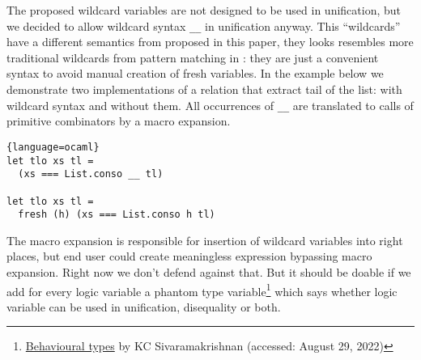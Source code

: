 The proposed wildcard variables are not designed to be used in unification, but we decided to allow wildcard syntax \lstinline|__| in unification anyway.
This ``wildcards'' have a different semantics from proposed in this paper, they looks resembles more traditional wildcards from pattern matching in \OCaml{}: they are just a convenient syntax to avoid manual creation of fresh variables. In the example below we demonstrate two implementations of a relation that extract tail of the list: with wildcard syntax and without them. All occurrences of \lstinline|__| are translated to calls of primitive combinators by a macro expansion.

\begin{minipage}{\linewidth}
\begin{lstlisting}{language=ocaml}
let tlo xs tl =
  (xs === List.conso __ tl)

let tlo xs tl =
  fresh (h) (xs === List.conso h tl)
\end{lstlisting}
\end{minipage}

\noindent The macro expansion is responsible for insertion of wildcard variables into right places, but end user could create meaningless \OCanren{} expression bypassing macro expansion. Right now we don't defend against that. But it should be doable if we add for every logic variable a phantom type variable\footnote{\href{https://kcsrk.info/ocaml/types/2016/06/30/behavioural-types/}{Behavioural types} by KC Sivaramakrishnan (accessed: August 29, 2022)} which says whether logic variable can be used in unification, disequality or both.
